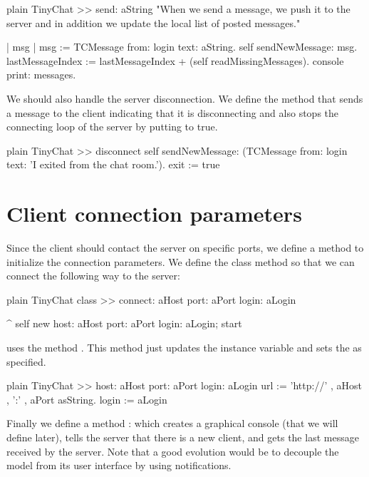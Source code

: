 \documentclass[10pt,twoside,english]{_support/latex/sbabook/sbabook}
\begin{document}
\begin{displaycode}{plain}
TinyChat >> send: aString
	"When we send a message, we push it to the server and in addition we update the local list of posted messages."
	
	| msg |
	msg := TCMessage from: login text: aString.
	self sendNewMessage: msg.
	lastMessageIndex := lastMessageIndex + (self readMissingMessages).
	console print: messages.
\end{displaycode}

We should also handle the server disconnection. We define the method 
  that sends a message to the client indicating that it is disconnecting and also stops 
 the connecting loop of the server by putting  to true.

\begin{displaycode}{plain}
TinyChat >> disconnect
	self sendNewMessage: (TCMessage from: login text: 'I exited from the chat room.').
	exit := true
\end{displaycode}
\section{Client connection parameters}
Since the client should contact the server on specific ports, we define a method to 
initialize the connection parameters. We define the class method  so that we
can connect the following way to the server: 

\begin{displaycode}{plain}
TinyChat class >> connect: aHost port: aPort login: aLogin

	^ self new
		host: aHost port: aPort login: aLogin;
		start
\end{displaycode}

 uses the method . This method just updates the  instance variable and sets the  as specified.

\begin{displaycode}{plain}
TinyChat >> host: aHost port: aPort login: aLogin
	url := 'http://' , aHost , ':' , aPort asString.
	login := aLogin
\end{displaycode}

Finally we define a method : which creates a graphical console (that we will define later), tells the server
that there is a new client, and gets the last message received by the server. 
Note that a good evolution would be to decouple the model from its user interface by using notifications. 
\end{document}
